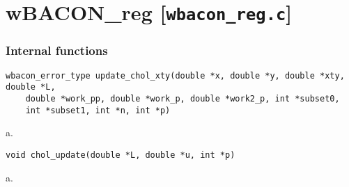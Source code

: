 \documentclass[a4paper,oneside,10pt,DIV=12]{scrreprt}
\begin{document}
\chapter{wBACON\_reg [\texttt{wbacon\_reg.c}]}

\vspace{2em}
\subsection*{Internal functions}
%

\begin{Description}
\end{Description}
\begin{Usage}
\begin{verbatim}
wbacon_error_type update_chol_xty(double *x, double *y, double *xty, double *L,
	double *work_pp, double *work_p, double *work2_p, int *subset0, 
	int *subset1, int *n, int *p)
\end{verbatim}
\end{Usage}
\begin{Arguments}
	\begin{ldescription}
		\item[\code{x}] a.
	\end{ldescription}
\end{Arguments}
\begin{Value}
\end{Value}

\begin{Description}
\end{Description}
\begin{Usage}
\begin{verbatim}
void chol_update(double *L, double *u, int *p)
\end{verbatim}
\end{Usage}
\begin{Arguments}
	\begin{ldescription}
		\item[\code{x}] a.
	\end{ldescription}
\end{Arguments}
\begin{Value}
\end{Value}
\end{document}
